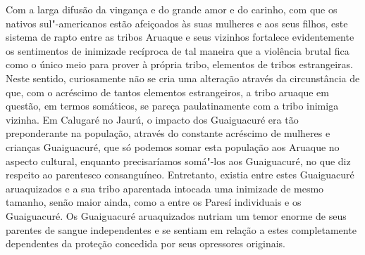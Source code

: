 Com a larga difusão da vingança e do grande amor e do carinho, com que
os nativos sul"-americanos estão afeiçoados às suas mulheres e aos seus filhos, este sistema de rapto entre as tribos Aruaque e seus vizinhos fortalece evidentemente os sentimentos de inimizade recíproca de tal
maneira que a violência brutal fica como o único meio para prover à
própria tribo, elementos de tribos estrangeiras. Neste sentido,
curiosamente não se cria uma alteração através da circunstância de que,
com o acréscimo de tantos elementos estrangeiros, a tribo aruaque em
questão, em termos somáticos, se pareça paulatinamente com a tribo
inimiga vizinha. Em Calugaré no Jaurú, o impacto dos Guaiguacuré era tão
preponderante na população, através do constante acréscimo de mulheres e
crianças Guaiguacuré, que só podemos somar esta população aos Aruaque no
aspecto cultural, enquanto precisaríamos somá"-los aos Guaiguacuré, no
que diz respeito ao parentesco consanguíneo. Entretanto, existia entre
estes Guaiguacuré aruaquizados e a sua tribo aparentada intocada uma
inimizade de mesmo tamanho, senão maior ainda, como a entre os Paresí
individuais e os Guaiguacuré. Os Guaiguacuré aruaquizados nutriam um
temor enorme de seus parentes de sangue independentes e se sentiam em
relação a estes completamente dependentes da proteção concedida por seus
opressores originais.

